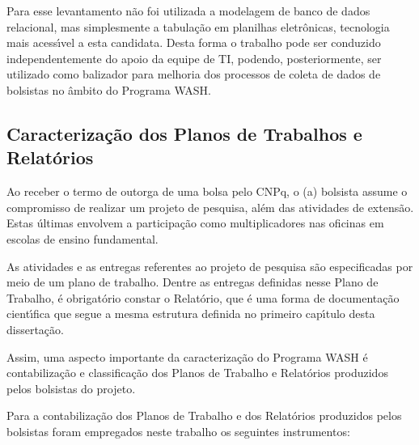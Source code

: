 \documentclass[
12pt,		%
openright,	%
twoside,  %
a4paper,			%
chapter=TITLE,		%
english,			%
french,				%
spanish,			%
brazil				%
]{USPSC-classe/USPSC}
\begin{document}
Para esse levantamento n\~ao foi utilizada a modelagem de banco de dados relacional, mas simplesmente a tabula\c{c}\~ao em planilhas eletr\^onicas, tecnologia mais acess\'{\i}vel a esta candidata. Desta forma o trabalho pode ser conduzido independentemente do apoio da equipe de TI, podendo, posteriormente, ser utilizado como balizador para melhoria dos processos de coleta de dados de bolsistas no \^ambito do Programa WASH.









\subsection[Caracteriza\c{c}\~ao dos Planos de Trabalhos e Relat\'orios]{Caracteriza\c{c}\~ao dos Planos de Trabalhos e Relat\'orios}\label{Caracteriza\c{c}\~ao dos Planos de Trabalhos e Relat\'orios}
Ao receber o termo de outorga de uma bolsa pelo CNPq, o (a) bolsista assume o compromisso de realizar um projeto de pesquisa, al\'em das atividades de extens\~ao. Estas \'ultimas envolvem a participa\c{c}\~ao como multiplicadores nas oficinas em escolas de ensino fundamental.









As atividades e as entregas referentes ao projeto de pesquisa s\~ao especificadas por meio de um plano de trabalho. Dentre as entregas definidas nesse Plano de Trabalho, \'e obrigat\'orio constar o Relat\'orio, que \'e uma forma de documenta\c{c}\~ao cient\'{\i}fica que segue a mesma estrutura definida no primeiro cap\'{\i}tulo desta disserta\c{c}\~ao.










Assim, uma aspecto importante da caracteriza\c{c}\~ao do Programa WASH \'e contabiliza\c{c}\~ao e classifica\c{c}\~ao dos Planos de Trabalho e Relat\'orios produzidos pelos bolsistas do projeto.









Para a contabiliza\c{c}\~ao dos Planos de Trabalho e dos Relat\'orios produzidos pelos bolsistas foram empregados neste trabalho os seguintes instrumentos:
\end{document}
